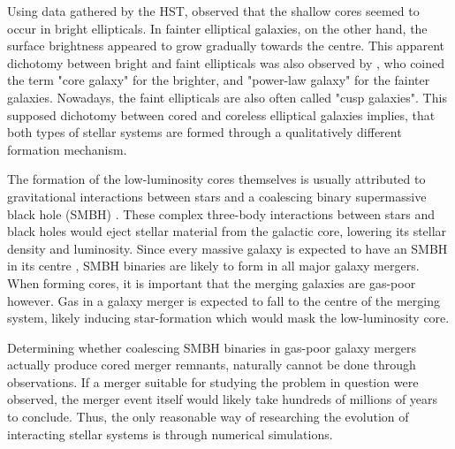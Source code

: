 \documentclass[english, twoside]{HYgradu}
\begin{document}
Using data gathered by the HST, \cite{Ferrarese1994} observed that the shallow cores seemed to occur in bright ellipticals. In fainter elliptical galaxies, on the other hand, the surface brightness appeared to grow gradually towards the centre. This apparent dichotomy between bright and faint ellipticals was also observed by \cite{Lauer1995}, who coined the term "core galaxy" for the brighter, and "power-law galaxy" for the fainter galaxies. Nowadays, the faint ellipticals are also often called "cusp galaxies". This supposed dichotomy between cored and coreless elliptical galaxies implies, that both types of stellar systems are formed through a qualitatively different formation mechanism. 


The formation of the low-luminosity cores themselves is usually attributed to gravitational interactions between stars and a coalescing binary supermassive black hole (SMBH) \citep{Begelman1980, Faber1997, GalaxyFormationAndEvo2010}. These complex three-body interactions between stars and black holes would eject stellar material from the galactic core, lowering its stellar density and luminosity. Since every massive galaxy is expected to have an SMBH in its centre \citep{Kormendy2013}, SMBH binaries are likely to form in all major galaxy mergers. When forming cores, it is important that the merging galaxies are gas-poor however. Gas in a galaxy merger is expected to fall to the centre of the merging system, likely inducing star-formation which would mask the low-luminosity core.

Determining whether coalescing SMBH binaries in gas-poor galaxy mergers actually produce cored merger remnants, naturally cannot be done through observations. If a merger suitable for studying the problem in question were observed, the merger event itself would likely take hundreds of millions of years to conclude. Thus, the only reasonable way of researching the evolution of interacting stellar systems is through numerical simulations.


\end{document}
